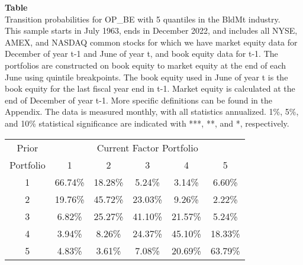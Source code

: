 \begin{table*}[ht!]
\raggedright
{}
\label{tab: transition_probs_OP_BE_BldMt_with_5_quantiles}
\textbf{Table \thetable} \\
Transition probabilities for OP_BE with 5 quantiles in the BldMt industry. \\
\hspace*{1em}This sample starts in July 1963, ends in December 2022, and includes all NYSE, AMEX, and NASDAQ common stocks for which we have market equity data for December of year t-1 and June of year t, and book equity data for t-1. The portfolios are constructed on book equity to market equity at the end of each June using quintile breakpoints.  The book equity used in June of year t is the book equity for the last fiscal year end in t-1.  Market equity is calculated at the end of December of year t-1.  More specific definitions can be found in the Appendix.  The data is measured monthly, with all statistics annualized.  1\%, 5\%, and 10\% statistical significance are indicated with ***, **, and *, respectively. \\
\vspace{0.5em}
\centering
\begin{adjustbox}{max width=\textwidth}
\begin{tabular}{@{}cccccc@{}}
\toprule
Prior & \multicolumn{5}{c}{Current Factor Portfolio} \\
Portfolio & 1 & 2 & 3 & 4 & 5 \\
\midrule
1 & 66.74\% & 18.28\% & 5.24\% & 3.14\% & 6.60\% \\
2 & 19.76\% & 45.72\% & 23.03\% & 9.26\% & 2.22\% \\
3 & 6.82\% & 25.27\% & 41.10\% & 21.57\% & 5.24\% \\
4 & 3.94\% & 8.26\% & 24.37\% & 45.10\% & 18.33\% \\
5 & 4.83\% & 3.61\% & 7.08\% & 20.69\% & 63.79\% \\
\bottomrule
\end{tabular}
\end{adjustbox}
\end{table*}